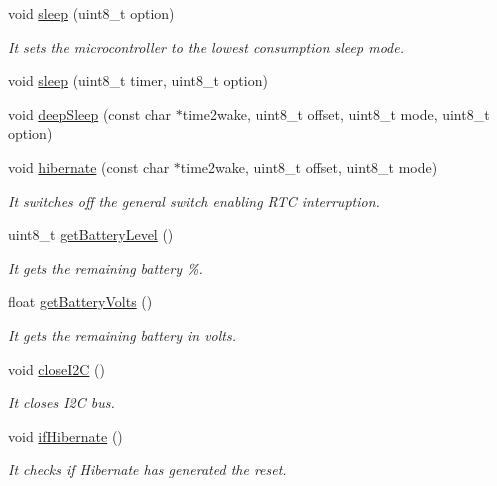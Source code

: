 \begin{DoxyCompactItemize}
void \hyperlink{class_wasp_p_w_r_abba7c7f0a1099e6de71cbf63a2bf7dad}{sleep} (uint8\+\_\+t option)
\begin{DoxyCompactList}\small\item\em It sets the microcontroller to the lowest consumption sleep mode. \end{DoxyCompactList}\item 
void \hyperlink{class_wasp_p_w_r_a5d92c2316e9d250359f681cba941807c}{sleep} (uint8\+\_\+t timer, uint8\+\_\+t option)
\item 
void \hyperlink{class_wasp_p_w_r_aab824e09a93206bea929cb27811144a0}{deep\+Sleep} (const char $\ast$time2wake, uint8\+\_\+t offset, uint8\+\_\+t mode, uint8\+\_\+t option)
\item 
void \hyperlink{class_wasp_p_w_r_a13a34c3cebd7f42fd23d0e1202f6735f}{hibernate} (const char $\ast$time2wake, uint8\+\_\+t offset, uint8\+\_\+t mode)
\begin{DoxyCompactList}\small\item\em It switches off the general switch enabling R\+TC interruption. \end{DoxyCompactList}\item 
uint8\+\_\+t \hyperlink{class_wasp_p_w_r_a7f9144cbe45b6d35b582d23cc8337767}{get\+Battery\+Level} ()
\begin{DoxyCompactList}\small\item\em It gets the remaining battery \%. \end{DoxyCompactList}\item 
float \hyperlink{class_wasp_p_w_r_ab5644b897b5e12cba165c4d200c82341}{get\+Battery\+Volts} ()
\begin{DoxyCompactList}\small\item\em It gets the remaining battery in volts. \end{DoxyCompactList}\item 
void \hyperlink{class_wasp_p_w_r_aac6b9ee2752e69995db3dd65d1c7e29b}{close\+I2C} ()
\begin{DoxyCompactList}\small\item\em It closes I2C bus. \end{DoxyCompactList}\item 
void \hyperlink{class_wasp_p_w_r_a115f4a85bf4c1ce9b5bb46153a078e4b}{if\+Hibernate} ()
\begin{DoxyCompactList}\small\item\em It checks if Hibernate has generated the reset. \end{DoxyCompactList}\item 

\end{DoxyCompactItemize}
